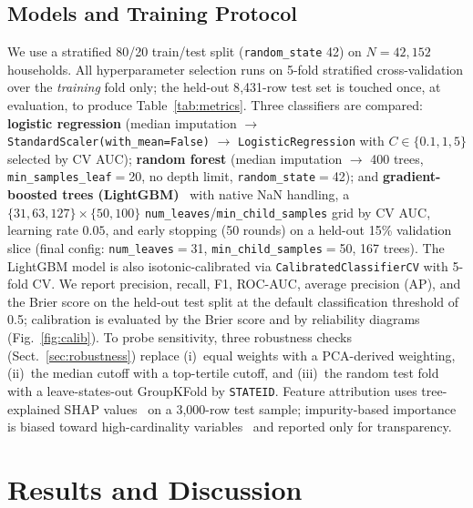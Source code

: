 \documentclass[colorlinks,balance]{asmeconf}
\begin{document}
\subsection{Models and Training Protocol}
We use a stratified 80/20 train/test split (\texttt{random\_state} 42) on $N \!=\! 42{,}152$ households. All hyperparameter selection runs on 5-fold stratified cross-validation over the \emph{training} fold only; the held-out 8{,}431-row test set is touched once, at evaluation, to produce Table~\ref{tab:metrics}. Three classifiers are compared: \textbf{logistic regression} (median imputation $\to$ \texttt{StandardScaler(with\_mean=False)} $\to$ \texttt{LogisticRegression} with $C \!\in\! \{0.1, 1, 5\}$ selected by CV AUC); \textbf{random forest} (median imputation $\to$ 400 trees, \texttt{min\_samples\_leaf}$=$20, no depth limit, \texttt{random\_state}$=$42); and \textbf{gradient-boosted trees (LightGBM)}~\cite{ke2017lightgbm} with native NaN handling, a $\{31, 63, 127\}\!\times\!\{50, 100\}$ \texttt{num\_leaves}/\texttt{min\_child\_samples} grid by CV AUC, learning rate $0.05$, and early stopping (50 rounds) on a held-out 15\% validation slice (final config: \texttt{num\_leaves}$=$31, \texttt{min\_child\_samples}$=$50, 167 trees). The LightGBM model is also isotonic-calibrated via \texttt{CalibratedClassifierCV} with 5-fold CV. We report precision, recall, F1, ROC-AUC, average precision (AP), and the Brier score on the held-out test split at the default classification threshold of 0.5; calibration is evaluated by the Brier score and by reliability diagrams (Fig.~\ref{fig:calib}). To probe sensitivity, three robustness checks (Sect.~\ref{sec:robustness}) replace (i)~equal weights with a PCA-derived weighting, (ii)~the median cutoff with a top-tertile cutoff, and (iii)~the random test fold with a leave-states-out GroupKFold by \texttt{STATEID}. Feature attribution uses tree-explained SHAP values~\cite{lundberg2017shap} on a 3{,}000-row test sample; impurity-based importance is biased toward high-cardinality variables~\cite{strobl2007bias} and reported only for transparency.

\section{Results and Discussion}
\end{document}
